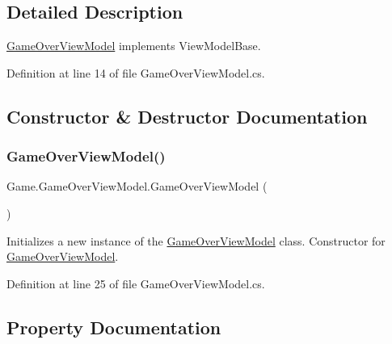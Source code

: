 \subsection{Detailed Description}
\mbox{\hyperlink{class_game_1_1_game_over_view_model}{Game\+Over\+View\+Model}} implements View\+Model\+Base. 



Definition at line 14 of file Game\+Over\+View\+Model.\+cs.



\subsection{Constructor \& Destructor Documentation}
\mbox{\label{class_game_1_1_game_over_view_model_a3e1275ccdb9f4b441759cfaf572ca5d8}} 
\subsubsection{\texorpdfstring{GameOverViewModel()}{GameOverViewModel()}}
{\footnotesize\ttfamily Game.\+Game\+Over\+View\+Model.\+Game\+Over\+View\+Model (\begin{DoxyParamCaption}{ }\end{DoxyParamCaption})}



Initializes a new instance of the \mbox{\hyperlink{class_game_1_1_game_over_view_model}{Game\+Over\+View\+Model}} class. Constructor for \mbox{\hyperlink{class_game_1_1_game_over_view_model}{Game\+Over\+View\+Model}}. 



Definition at line 25 of file Game\+Over\+View\+Model.\+cs.



\subsection{Property Documentation}
\mbox{\label{class_game_1_1_game_over_view_model_a473a16497d7858b4dc1243cf8a55059e}} 
